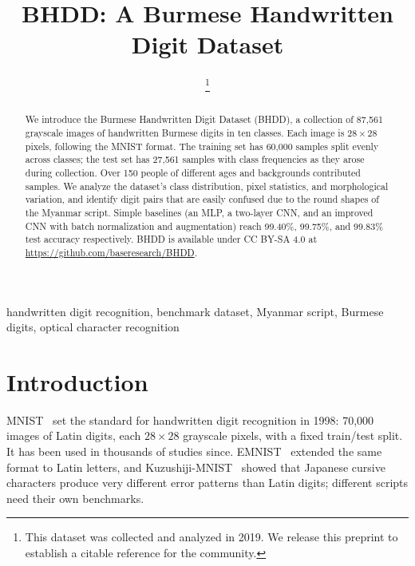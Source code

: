 \documentclass[conference]{IEEEtran}
\begin{document}
\title{BHDD: A Burmese Handwritten Digit Dataset}

\author{
  \thanks{This dataset was collected and analyzed in 2019. We release this
  preprint to establish a citable reference for the community.}
}

\maketitle

\begin{abstract}
We introduce the Burmese Handwritten Digit Dataset (BHDD), a collection
of 87,561 grayscale images of handwritten Burmese digits in ten classes.
Each image is $28\times28$ pixels, following the MNIST format. The
training set has 60,000 samples split evenly across classes; the test
set has 27,561 samples with class frequencies as they arose during
collection. Over 150 people
of different ages and backgrounds contributed samples. We analyze the
dataset's class distribution, pixel statistics, and morphological
variation, and identify digit pairs that are easily confused due to the
round shapes of the Myanmar script. Simple baselines (an MLP, a two-layer CNN, and an improved
CNN with batch normalization and augmentation) reach 99.40\%,
99.75\%, and 99.83\% test accuracy respectively.
BHDD is available under CC BY-SA 4.0 at
\url{https://github.com/baseresearch/BHDD}.
\end{abstract}

\begin{IEEEkeywords}
handwritten digit recognition, benchmark dataset, Myanmar script,
Burmese digits, optical character recognition
\end{IEEEkeywords}

\section{Introduction}

MNIST~\cite{lecun1998gradient} set the standard for handwritten digit
recognition in 1998: 70,000 images of Latin digits, each $28\times28$
grayscale pixels, with a fixed train/test split. It has been used in
thousands of studies since. EMNIST~\cite{cohen2017emnist} extended the
same format to Latin letters, and
Kuzushiji-MNIST~\cite{clanuwat2018deep} showed that Japanese cursive
characters produce very different error patterns than Latin
digits; different scripts need their own benchmarks.
\end{document}
